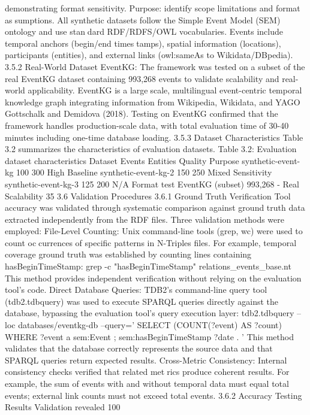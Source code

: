 demonstrating format sensitivity. Purpose: identify scope limitations and format assumptions.
All synthetic datasets follow the Simple Event Model (SEM) ontology and use standard RDF/RDFS/OWL vocabularies. Events include temporal anchors (begin/end timestamps), spatial information (locations), participants (entities), and external links (owl:sameAs
to Wikidata/DBpedia).
3.5.2 Real-World Dataset
EventKG: The framework was tested on a subset of the real EventKG dataset containing
993,268 events to validate scalability and real-world applicability. EventKG is a largescale, multilingual event-centric temporal knowledge graph integrating information from
Wikipedia, Wikidata, and YAGO Gottschalk and Demidova (2018). Testing on EventKG
confirmed that the framework handles production-scale data, with total evaluation time
of 30-40 minutes including one-time database loading.
3.5.3 Dataset Characteristics
Table 3.2 summarizes the characteristics of evaluation datasets.
Table 3.2: Evaluation dataset characteristics
Dataset Events Entities Quality Purpose
synthetic-event-kg 100 300 High Baseline
synthetic-event-kg-2 150 250 Mixed Sensitivity
synthetic-event-kg-3 125 200 N/A Format test
EventKG (subset) 993,268 - Real Scalability
35
3.6 Validation Procedures
3.6.1 Ground Truth Verification
Tool accuracy was validated through systematic comparison against ground truth data
extracted independently from the RDF files. Three validation methods were employed:
File-Level Counting: Unix command-line tools (grep, wc) were used to count occurrences of specific patterns in N-Triples files. For example, temporal coverage ground
truth was established by counting lines containing hasBeginTimeStamp:
grep -c "hasBeginTimeStamp" relations_events_base.nt
This method provides independent verification without relying on the evaluation tool’s
code.
Direct Database Queries: TDB2’s command-line query tool (tdb2.tdbquery) was
used to execute SPARQL queries directly against the database, bypassing the evaluation
tool’s query execution layer:
tdb2.tdbquery --loc databases/eventkg-db --query=’
SELECT (COUNT(?event) AS ?count) WHERE {
?event a sem:Event ; sem:hasBeginTimeStamp ?date .
}’
This method validates that the database correctly represents the source data and that
SPARQL queries return expected results.
Cross-Metric Consistency: Internal consistency checks verified that related metrics produce coherent results. For example, the sum of events with and without temporal
data must equal total events; external link counts must not exceed total events.
3.6.2 Accuracy Testing Results
Validation revealed 100%
